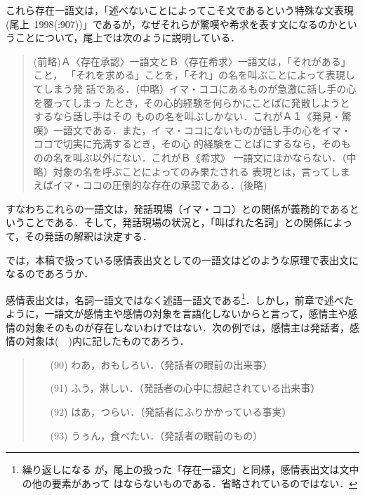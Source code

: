 これら存在一語文は，「述べないことによってこそ文であるという特殊な文表現\\
(尾上~1998(:907))」であるが，なぜそれらが驚嘆や希求を表す文になるのかとい
うことについて，尾上では次のように説明している．

\small
\begin{quote}
 (前略)Ａ〈存在承認〉一語文とＢ〈存在希求〉一語文は，「それがある」こと，
 「それを求める」ことを，「それ」の名を叫ぶことによって表現してしまう発
 話である．（中略）イマ・ココにあるものが急激に話し手の心を覆ってしまっ
 たとき，その心的経験を何らかにことばに発散しようとするなら話し手はその
 ものの名を叫ぶしかない．これがＡ１《発見・驚嘆》一語文である．また，イ
 マ・ココにないものが話し手の心をイマ・ココで切実に充満するとき，その心
 的経験をことばにするなら，そのものの名を叫ぶ以外にない．これがＢ《希求》
 一語文にほかならない．（中略）対象の名を呼ぶことによってのみ果たされる
 表現とは，言ってしまえばイマ・ココの圧倒的な存在の承認である．(後略)
\end{quote}
\normalsize

すなわちこれらの一語文は，発話現場（イマ・ココ）との関係が義務的であると
いうことである．そして，発話現場の状況と，「叫ばれた名詞」との関係によっ
て，その発話の解釈は決定する．

では，本稿で扱っている感情表出文としての一語文はどのような原理で表出文に
なるのであろうか．

感情表出文は，名詞一語文ではなく述語一語文である\footnote{繰り返しになる
が，尾上の扱った「存在一語文」と同様，感情表出文は文中の他の要素があって
はならないものである．省略されているのではない．}．しかし，前章で述べた
ように，一語文が感情主や感情の対象を言語化しないからと言って，感情主や感
情の対象そのものが存在しないわけではない．次の例では，感情主は発話者，感
情の対象は(　)内に記したものであろう．

\vspace{0.3cm}
\begin{quote}
\begin{itemize}
 \item[(90)] わあ，おもしろい．（発話者の眼前の出来事） 
 \item[(91)] ふう，淋しい．（発話者の心中に想起されている出来事）
 \item[(92)] はあ，つらい．（発話者にふりかかっている事実）
 \item[(93)] うぅん，食べたい．（発話者の眼前のもの）
\end{itemize}
\end{quote}
\vspace{0.3cm}

